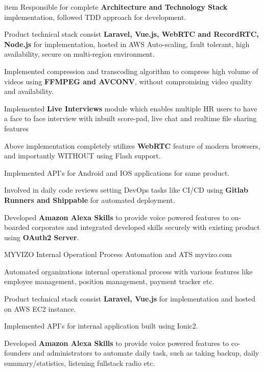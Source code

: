 \begin{cventries}
{\begin{cvitems}
        item {Responsible for complete \textbf{Architecture and Technology Stack} implementation, followed TDD approach for development.}
        \item {Product technical stack consist \textbf{Laravel, Vue.js, WebRTC and RecordRTC, Node.js} for implementation, hosted in AWS Auto-scaling, fault tolerant, high availability, secure on multi-region environment.}
        \item {Implemented compression and transcoding algorithm to compress high volume of videos using \textbf{FFMPEG and AVCONV}, without compromising video quality and availability.}
        \item {Implemented \textbf{Live Interviews} module which enables multiple HR users to have a face to face interview with inbuilt score-pad, live chat and realtime file sharing features}
        \item {Above implementation completely utilizes \textbf{WebRTC} feature of modern browsers, and importantly WITHOUT using Flash support.}
        \item {Implemented API's for Android and IOS applications for same product.}
        \item {Involved in daily code reviews setting DevOps tasks like CI/CD using \textbf{Gitlab Runners and Shippable} for automated deployment.}
        \item {Developed \textbf{Amazon Alexa Skills} to provide voice powered features to on-boarded corporates and integrated developed skills securely with existing product using \textbf{OAuth2 Server}. }
        \\
      \end{cvitems}
    }
    \cventry
    {MYVIZO} %
    {Internal Operationl Process Automation and ATS} %
    {myvizo.com} %
    { } %
    {
      \begin{cvitems} %
        \item {Automated organizations internal operational process with various features like employee management, position management, payment tracker etc.}
        \item {Product technical stack consist \textbf{Laravel, Vue.js} for implementation and hosted on AWS EC2 instance.}
        \item {Implemented API's for internal application built using Ionic2.}
        \item {Developed \textbf{Amazon Alexa Skills} to provide voice powered features to co-founders and administrators to automate daily task, such as taking backup, daily summary/statistics, listening fullstack radio etc. }

\end{cvitems}}
\end{cventries}
